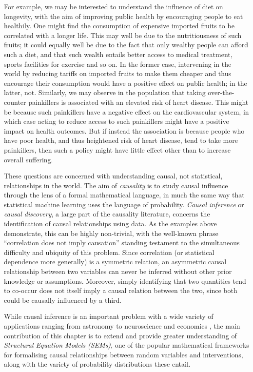 For example, we may be interested to understand the influence of diet on longevity, with the aim of improving public health by encouraging people to eat healthily. 
One might find the consumption of expensive imported fruits to be correlated with a longer life. This may well be due to the nutritiousness of such fruits; it could equally well be due to the fact that only wealthy people can afford such a diet, and that such wealth entails better access to medical treatment, sports facilities for exercise and so on. In the former case, intervening in the world by reducing tariffs on imported fruits to make them cheaper and thus encourage their consumption would have a positive effect on public health; in the latter, not.
Similarly, we may observe in the population that taking over-the-counter painkillers is associated with an elevated risk of heart disease. This might be because such painkillers have a negative effect on the cardiovascular system, in which case acting to reduce access to such painkillers might have a positive impact on health outcomes. But if instead the association is because people who have poor health, and thus heightened risk of heart disease, tend to take more painkillers, then such a policy might have little effect other than to increase overall suffering.

These questions are concerned with understanding causal, not statistical, relationships in the world. 
The aim of \emph{causality} is to study causal influence through the lens of a formal mathematical language, in much the same way that statistical machine learning uses the language of probability. 
\emph{Causal inference} or \emph{causal discovery}, a large part of the causality literature, concerns the identification of causal relationships using data.
As the examples above demonstrate, this can be highly non-trivial, with the well-known phrase ``correlation does not imply causation'' standing testament to the simultaneous difficulty and ubiquity of this problem.
Since correlation (or statistical dependence more generally) is a symmetric relation, an asymmetric causal relationship between two variables can never be inferred without other prior knowledge or assumptions. 
Moreover, simply identifying that two quantities tend to co-occur does not itself imply a causal relation between the two, since both could be causally influenced by a third.

While causal inference is an important problem with a wide variety of applications ranging from astronomy to neuroscience and economics \citep{scholkopf2016modeling, ding200617, hicks1980causality}, the main contribution of this chapter is to extend and provide greater understanding of \emph{Structural Equation Models (SEMs)}, one of the popular mathematical frameworks for formalising causal relationships between random variables and interventions, along with the variety of probability distributions these entail.
 
